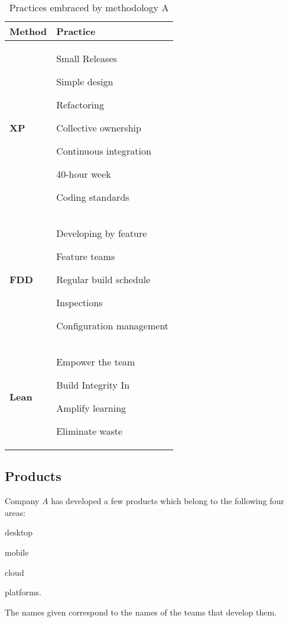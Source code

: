 \begin{table} [H]
\caption{Practices embraced by methodology A}
\begin{tabular}{| p{2cm} | p{13cm}|}
    \hline
     \textbf{Method} & \textbf{Practice} \\ \hline
     \textbf{XP}  & \begin{inparaenum} [a\upshape)]
     				\item Small Releases \item Simple design \item Refactoring \item Collective ownership \item Continuous integration \item 40-hour week \item Coding standards
					\end{inparaenum}      \\ \hline
     \textbf{FDD}  & \begin{inparaenum} [a\upshape)]  \item Developing by feature \item Feature teams \item Regular build schedule \item Inspections \item Configuration management
     				  \end{inparaenum}\\ \hline
     \textbf{Lean} & \begin{inparaenum} [a\upshape)] \item Empower the team \item Build Integrity In \item Amplify learning \item Eliminate waste
     				 \end{inparaenum} \\ \hline
\end{tabular}
\label{table:methodologyA_practices}
\end{table}

\subsection{Products}
Company $A$ has developed a few products which belong to the following four areas: 
\begin{inparaenum} [a\upshape)]
\item desktop
\item mobile
\item cloud
\item platforms.
\end{inparaenum}
The names given correspond to the names of the teams that develop them.

